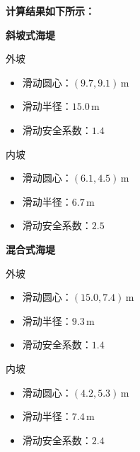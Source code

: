 \documentclass[UTF8, a4paper, 12pt]{ctexart} %
\begin{document}
\textbf{计算结果如下所示：}

\par

\textbf{斜坡式海堤}

外坡
\begin{itemize}
    \item 滑动圆心：$(9.7, 9.1)\,\text{m}$
    \item 滑动半径：$15.0\,\text{m}$
    \item 滑动安全系数：$1.4$
\end{itemize}
\par
内坡
\begin{itemize}
    \item 滑动圆心：$(6.1, 4.5)\,\text{m}$
    \item 滑动半径：$6.7\,\text{m}$
    \item 滑动安全系数：$2.5$
\end{itemize}

\par
\textbf{混合式海堤}


\par
外坡
\begin{itemize}
    \item 滑动圆心：$(15.0, 7.4)\,\text{m}$
    \item 滑动半径：$9.3\,\text{m}$
    \item 滑动安全系数：$1.4$
\end{itemize}

\par
内坡
\begin{itemize}
    \item 滑动圆心：$(4.2, 5.3)\,\text{m}$
    \item 滑动半径：$7.4\,\text{m}$
    \item 滑动安全系数：$2.4$
\end{itemize}
\end{document}
